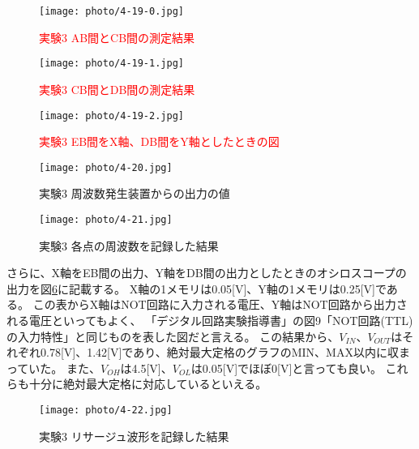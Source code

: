 \documentclass[dvipdfmx]{jsarticle}
\newcommand{\Add}[1]{\textcolor{red}{#1}}
\begin{document}
\begin{figure}[hbtp]
  \begin{center}
    \texttt{[image: photo/4-19-0.jpg]}
  \end{center}
  \caption{\Add{実験3 AB間とCB間の測定結果}}
  \label{fig:4-19-0}
\end{figure}

\begin{figure}[hbtp]
  \begin{center}
    \texttt{[image: photo/4-19-1.jpg]}
  \end{center}
  \caption{\Add{実験3 CB間とDB間の測定結果}}
  \label{fig:4-19-1}
\end{figure}

\begin{figure}[hbtp]
  \begin{center}
    \texttt{[image: photo/4-19-2.jpg]}
  \end{center}
  \caption{\Add{実験3 EB間をX軸、DB間をY軸としたときの図}}
  \label{fig:4-19-2}
\end{figure}

\begin{figure}[hbtp]
  \begin{center}
    \texttt{[image: photo/4-20.jpg]}
  \end{center}
  \caption{実験3 周波数発生装置からの出力の値}
  \label{fig:4-20}
\end{figure}

\begin{figure}[hbtp]
  \begin{center}
    \texttt{[image: photo/4-21.jpg]}
  \end{center}
  \caption{実験3 各点の周波数を記録した結果} 
  \label{fig:4-21}
\end{figure}

\clearpage

さらに、X軸をEB間の出力、Y軸をDB間の出力としたときのオシロスコープの出力を図\ref{fig:4-22}に記載する。
X軸の1メモリは0.05[V]、Y軸の1メモリは0.25[V]である。
この表からX軸はNOT回路に入力される電圧、Y軸はNOT回路から出力される電圧といってもよく、
「デジタル回路実験指導書」の図9「NOT回路(TTL)の入力特性」と同じものを表した図だと言える。
この結果から、$V_{IN}$、$V_{OUT}$はそれぞれ0.78[V]、1.42[V]であり、絶対最大定格のグラフのMIN、MAX以内に収まっていた。
また、$V_{OH}$は4.5[V]、$V_{OL}$は0.05[V]でほぼ0[V]と言っても良い。
これらも十分に絶対最大定格に対応しているといえる。

\begin{figure}[hbtp]
  \begin{center}
    \texttt{[image: photo/4-22.jpg]}
  \end{center}
  \caption{実験3 リサージュ波形を記録した結果}
  \label{fig:4-22}
\end{figure}
\end{document}

